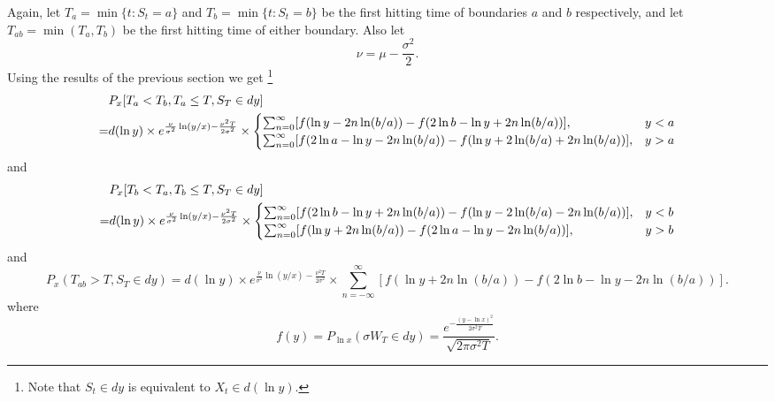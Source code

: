 Again, let $T_a=\min \{t:S_t=a \}$ and $T_b=\min \{t:S_t=b \}$ be the first 
hitting time of boundaries $a$ and $b$ respectively, and let 
$T_{ab}=\min(T_a,T_b)$ be the first hitting time of either boundary. 
Also let
\[
	\nu = \mu - \frac{\sigma^2}{2}.
\]
Using the results of the previous section we get
\footnote{Note that $S_t\in dy$ is equivalent to $X_t\in d(\ln y)$.}
\begin{align}
	 & P_x[T_a<T_b, T_a\le T, S_T\in dy]  \notag \\
	=& d(\ln y)\times e^{\frac{\nu}{\sigma^2}\ln(y/x) - \frac{\nu^2 T}{2\sigma^2}} \times
	   \begin{cases}
			 \sum_{n=0}^{\infty} 
			   [ f(\ln{y}-2n \ln(b/a)) - f(2\ln{b}-\ln{y}+2n\ln(b/a)) ],   & y<a \\
			 \sum_{n=0}^{\infty} 
			   [ f(2\ln a- \ln y-2n\ln(b/a)) - f(\ln y+2\ln(b/a) + 2n\ln(b/a)) ], & y>a
     \end{cases}
\end{align}
and
\begin{align}
	& P_x[T_b<T_a, T_b\le T, S_T\in dy]  \notag \\
	=& d(\ln y)\times e^{\frac{\nu}{\sigma^2}\ln(y/x) - \frac{\nu^2 T}{2\sigma^2}} \times
    \begin{cases}
			\sum_{n=0}^{\infty} 
			  [ f(2\ln b-\ln y+2n\ln(b/a)) - f(\ln y-2\ln(b/a) - 2n\ln(b/a)) ], & y<b \\
			\sum_{n=0}^{\infty} 
  			[ f(\ln y+2n\ln(b/a)) - f(2\ln a-\ln y-2n\ln(b/a)) ],  & y>b
    \end{cases}
\end{align}
and
\begin{equation}
	P_x(T_{ab}>T, S_T\in dy)  
	= d(\ln y)\times e^{\frac{\nu}{\sigma^2}\ln(y/x) - \frac{\nu^2 T}{2\sigma^2}} \times
	  \sum_{n=-\infty}^{\infty} [ f(\ln y+2n\ln(b/a)) - f(2\ln b-\ln y-2n\ln(b/a)) ].
\end{equation}
where
\[
	f(y) = P_{\ln x}(\sigma W_T\in dy) 
	     = \frac{e^{-\frac{(y-\ln x)^2}{2\sigma^2 T}}}{\sqrt{2\pi \sigma^2 T}}.
\]














